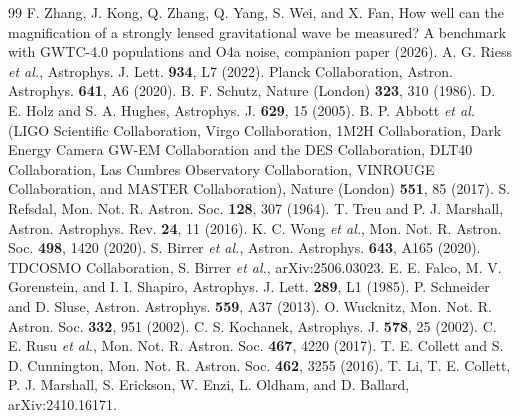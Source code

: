 \begin{thebibliography}{99}
F. Zhang, J. Kong, Q. Zhang, Q. Yang, S. Wei, and X. Fan, How well can the magnification of a strongly lensed gravitational wave be measured? A benchmark with GWTC-4.0 populations and O4a noise, companion paper (2026).
A. G. Riess \textit{et al.}, Astrophys. J. Lett. \textbf{934}, L7 (2022).
Planck Collaboration, Astron. Astrophys. \textbf{641}, A6 (2020).
B. F. Schutz, Nature (London) \textbf{323}, 310 (1986).
D. E. Holz and S. A. Hughes, Astrophys. J. \textbf{629}, 15 (2005).
B. P. Abbott \textit{et al.} (LIGO Scientific Collaboration, Virgo Collaboration, 1M2H Collaboration, Dark Energy Camera GW-EM Collaboration and the DES Collaboration, DLT40 Collaboration, Las Cumbres Observatory Collaboration, VINROUGE Collaboration, and MASTER Collaboration), Nature (London) \textbf{551}, 85 (2017).
S. Refsdal, Mon. Not. R. Astron. Soc. \textbf{128}, 307 (1964).
T. Treu and P. J. Marshall, Astron. Astrophys. Rev. \textbf{24}, 11 (2016).
K. C. Wong \textit{et al.}, Mon. Not. R. Astron. Soc. \textbf{498}, 1420 (2020).
S. Birrer \textit{et al.}, Astron. Astrophys. \textbf{643}, A165 (2020).
TDCOSMO Collaboration, S. Birrer \textit{et al.}, arXiv:2506.03023.
E. E. Falco, M. V. Gorenstein, and I. I. Shapiro, Astrophys. J. Lett. \textbf{289}, L1 (1985).
P. Schneider and D. Sluse, Astron. Astrophys. \textbf{559}, A37 (2013).
O. Wucknitz, Mon. Not. R. Astron. Soc. \textbf{332}, 951 (2002).
C. S. Kochanek, Astrophys. J. \textbf{578}, 25 (2002).
C. E. Rusu \textit{et al.}, Mon. Not. R. Astron. Soc. \textbf{467}, 4220 (2017).
T. E. Collett and S. D. Cunnington, Mon. Not. R. Astron. Soc. \textbf{462}, 3255 (2016).
T. Li, T. E. Collett, P. J. Marshall, S. Erickson, W. Enzi, L. Oldham, and D. Ballard, arXiv:2410.16171.

\end{thebibliography}
